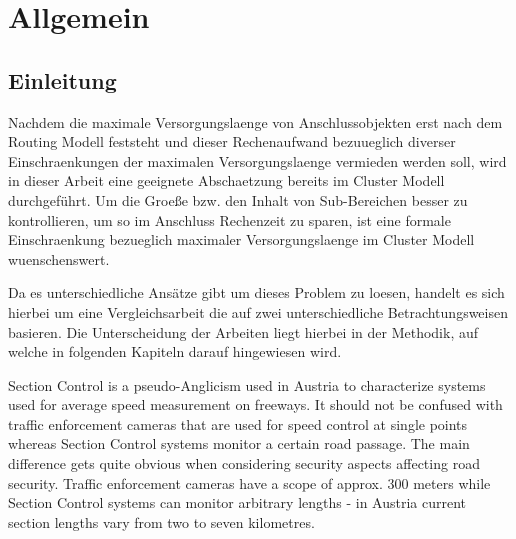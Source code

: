 \documentclass[oneside,bachelor,etd]{BYUPhys}
\begin{document}
 \frontmatter

\makepreliminarypages

 \singlespace

 \tableofcontents
 \clearemptydoublepage

 \listoffigures
 \clearemptydoublepage

 \doublespace

 \mainmatter



\chapter{Allgemein}

\section{Einleitung}
\label{sec:1general}

Nachdem die maximale Versorgungslaenge von Anschlussobjekten erst nach dem Routing Modell feststeht und dieser Rechenaufwand bezuueglich diverser Einschraenkungen der maximalen Versorgungslaenge vermieden werden soll, wird in dieser Arbeit eine geeignete Abschaetzung bereits im Cluster Modell durchgeführt. Um die Groeße bzw. den Inhalt von Sub-Bereichen besser zu kontrollieren, um so im Anschluss Rechenzeit zu sparen, ist eine formale Einschraenkung bezueglich maximaler Versorgungslaenge im Cluster Modell wuenschenswert.

Da es unterschiedliche Ansätze gibt um dieses Problem zu loesen, handelt es sich hierbei um eine Vergleichsarbeit die auf zwei unterschiedliche Betrachtungsweisen basieren. Die Unterscheidung der Arbeiten liegt hierbei in der Methodik, auf welche in folgenden Kapiteln darauf hingewiesen wird.

Section Control is a pseudo-Anglicism used in Austria to characterize systems used for average speed measurement on freeways. 
It should not be confused with traffic enforcement cameras that are used for speed control at single points whereas 
Section Control systems monitor a certain road passage. The main difference gets quite obvious when considering security aspects
affecting road security. Traffic enforcement cameras have a scope of approx. 300 meters while 
Section Control systems can monitor arbitrary lengths - in Austria current section lengths vary from two to seven kilometres.
\end{document}

